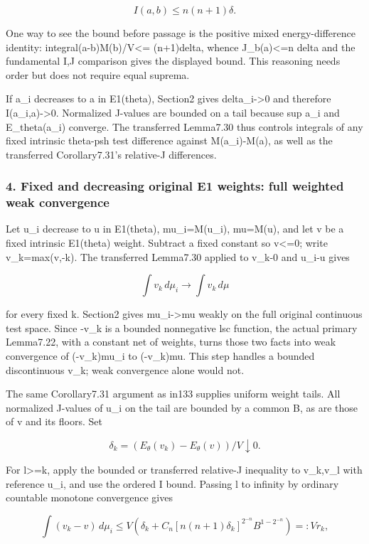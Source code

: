 \documentclass[
  10pt,
]{article}
\begin{document}
\[I(a,b)\le n(n+1)\delta.\]

One way to see the bound before passage is the positive mixed
energy-difference identity: integral(a-b)M(b)/V\textless= (n+1)delta,
whence J\_b(a)\textless=n delta and the fundamental I,J comparison gives
the displayed bound. This reasoning needs order but does not require
equal suprema.

If a\_i decreases to a in E1(theta), Section2 gives
delta\_i-\textgreater0 and therefore I(a\_i,a)-\textgreater0. Normalized
J-values are bounded on a tail because sup a\_i and E\_theta(a\_i)
converge. The transferred Lemma7.30 thus controls integrals of any fixed
intrinsic theta-psh test difference against M(a\_i)-M(a), as well as the
transferred Corollary7.31's relative-J differences.

\subsubsection{4. Fixed and decreasing original E1 weights: full
weighted weak
convergence}\label{fixed-and-decreasing-original-e1-weights-full-weighted-weak-convergence}

Let u\_i decrease to u in E1(theta), mu\_i=M(u\_i), mu=M(u), and let v
be a fixed intrinsic E1(theta) weight. Subtract a fixed constant so
v\textless=0; write v\_k=max(v,-k). The transferred Lemma7.30 applied to
v\_k-0 and u\_i-u gives

\[\int v_k\,d\mu_i\longrightarrow\int v_k\,d\mu\]

for every fixed k. Section2 gives mu\_i-\textgreater mu weakly on the
full original continuous test space. Since -v\_k is a bounded
nonnegative lsc function, the actual primary Lemma7.22, with a constant
net of weights, turns those two facts into weak convergence of
(-v\_k)mu\_i to (-v\_k)mu. This step handles a bounded discontinuous
v\_k; weak convergence alone would not.

The same Corollary7.31 argument as in133 supplies uniform weight tails.
All normalized J-values of u\_i on the tail are bounded by a common B,
as are those of v and its floors. Set

\[\delta_k=(E_\theta(v_k)-E_\theta(v))/V\downarrow0.\]

For l\textgreater=k, apply the bounded or transferred relative-J
inequality to v\_k,v\_l with reference u\_i, and use the ordered I
bound. Passing l to infinity by ordinary countable monotone convergence
gives

\[\int(v_k-v)\,d\mu_i
\le V\left(\delta_k+C_n[n(n+1)\delta_k]^{2^{-n}}B^{1-2^{-n}}\right)=:Vr_k,\]
\end{document}
